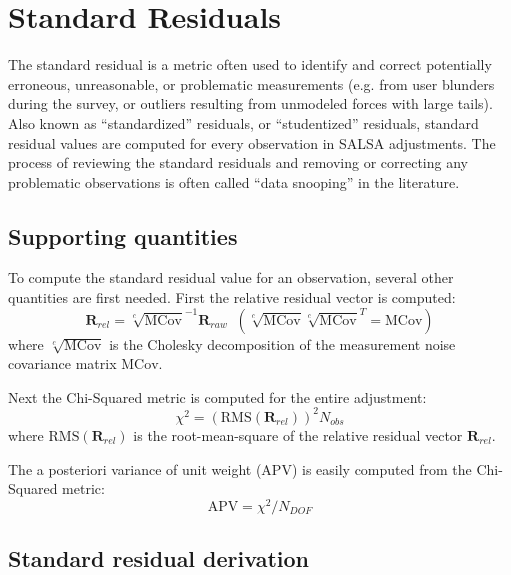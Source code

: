 \section{Standard Residuals} \label{sect:StdRes}

The standard residual is a metric often used to identify and correct potentially erroneous, unreasonable, or problematic measurements (e.g. from user blunders during the survey, or outliers resulting from unmodeled forces with large tails). Also known as ``standardized'' residuals, or ``studentized'' residuals, standard residual values are computed for every observation in SALSA adjustments. The process of reviewing the standard residuals and removing or correcting any problematic observations is often called ``data snooping'' in the literature.

\subsection{Supporting quantities}

To compute the standard residual value for an observation, several other quantities are first needed. First the relative residual vector is computed:
\begin{equation}\label{eq:RelRes}
\textbf{R}_{rel} = \sqrt[c]{\text{MCov}}^{-1} \textbf{R}_{raw} \;\; \left( \sqrt[c]{\text{MCov}} \sqrt[c]{\text{MCov}}^T = \text{MCov} \right)
\end{equation}
where $\sqrt[c]{\text{MCov}}$ is the Cholesky decomposition \cite{golub1996matrix} of the measurement noise covariance matrix $\text{MCov}$.

Next the Chi-Squared metric \cite{ghilani} is computed for the entire adjustment:
\begin{equation}\label{eq:ChiSquared}
\chi^2 = \left( \text{RMS}\left(\textbf{R}_{rel}\right)\right)^2 N_{obs}
\end{equation}
where $\text{RMS}\left(\textbf{R}_{rel}\right)$ is the root-mean-square of the relative residual vector $\textbf{R}_{rel}$. 

The a posteriori variance of unit weight (APV) is easily computed from the Chi-Squared metric:
\begin{equation}\label{eq:APV}
\text{APV} = \chi^2 / N_{DOF}
\end{equation}

\subsection{Standard residual derivation}

